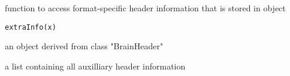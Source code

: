 \begin{Description}\relax
function to access format-specific header information that is stored
in  object
\end{Description}
\begin{Usage}
\begin{verbatim}
extraInfo(x)
\end{verbatim}
\end{Usage}
\begin{Arguments}
\begin{ldescription}
\item[\code{x}] an object derived from class "BrainHeader" 
\end{ldescription}
\end{Arguments}
\begin{Value}
a list containing all auxilliary header information
\end{Value}

